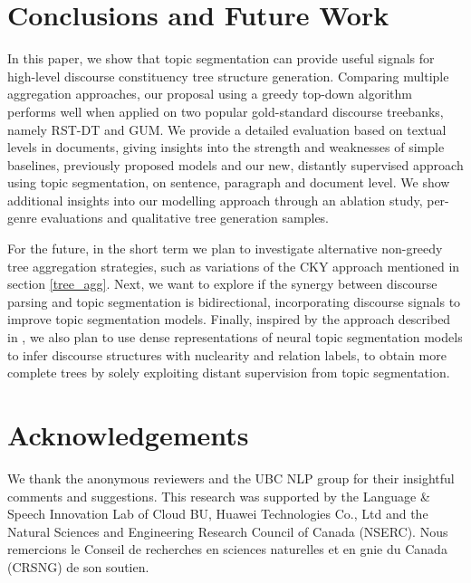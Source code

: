 \documentclass[letterpaper]{article} %
\begin{document}
\section{Conclusions and Future Work}
In this paper, we show that topic segmentation can provide useful signals for high-level discourse constituency tree structure generation. Comparing multiple aggregation approaches, our proposal using a greedy top-down algorithm performs well when applied on two popular gold-standard discourse treebanks, namely RST-DT and GUM. We provide a detailed evaluation based on textual levels in documents, giving insights into the strength and weaknesses of simple baselines, previously proposed models and our new, distantly supervised approach using topic segmentation, on sentence, paragraph and document level. We  show additional insights into our modelling approach through an ablation study, per-genre evaluations and qualitative tree generation samples.

For the future, in the short term we plan to investigate alternative non-greedy tree aggregation strategies, such as variations of the CKY approach mentioned in section \ref{tree_agg}. Next, we want to explore if the synergy between discourse parsing and topic segmentation is bidirectional, incorporating discourse signals to improve topic segmentation models. Finally, inspired by the approach described in \citet{kobayashi-etal-2019-split}, we also plan to use dense representations of neural topic segmentation models to infer discourse structures with nuclearity and relation labels, to obtain more complete trees by solely exploiting distant supervision from topic segmentation.

\section*{Acknowledgements}
We thank the anonymous reviewers and the UBC NLP group for their insightful comments and suggestions. This research was supported by the Language \& Speech Innovation Lab of Cloud BU, Huawei Technologies Co., Ltd and the Natural Sciences and Engineering Research Council of Canada (NSERC). Nous remercions le Conseil de recherches en sciences naturelles et en gnie du Canada (CRSNG) de son soutien.

% 


\clearpage

\onecolumn

\appendix
\end{document}
